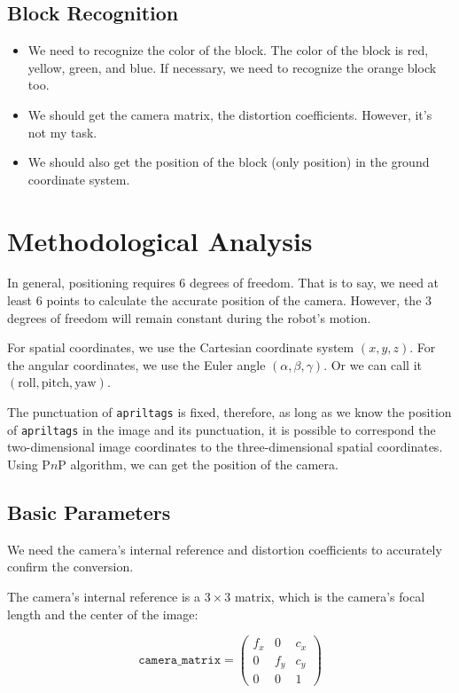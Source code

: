 \documentclass{article}
\begin{document}
\subsection{Block Recognition}

\begin{itemize}
  \item We need to recognize the color of the block. The color of the block is red, yellow, green, and blue. If necessary, we need to recognize the orange block too.
  \item We should get the camera matrix, the distortion coefficients. However, it's not my task.
  \item We should also get the position of the block (only position) in the ground coordinate system.
\end{itemize}

\section{Methodological Analysis}
In general, positioning requires $6$ degrees of freedom. That is to say, we need at least $6$ points to calculate the accurate position of the camera. However, the $3$ degrees of freedom will remain constant during the robot's motion.

For spatial coordinates, we use the Cartesian coordinate system $\left(x,y,z\right)$. For the angular coordinates, we use the Euler angle $\left(\alpha,\beta,\gamma\right)$. Or we can call it $\left(\mathrm{roll},\mathrm{pitch},\mathrm{yaw}\right)$.

The punctuation of \texttt{apriltags} is fixed, therefore, as long as we know the position of \texttt{apriltags} in the image and its punctuation, it is possible to correspond the two-dimensional image coordinates to the three-dimensional spatial coordinates. Using P$n$P algorithm, we can get the position of the camera.

\subsection{Basic Parameters}
We need the camera's internal reference and distortion coefficients to accurately confirm the conversion.

The camera's internal reference is a $3\times3$ matrix, which is the camera's focal length and the center of the image:

\[
  \texttt{camera\_matrix}=\left(\begin{matrix}
    f_x & 0 & c_x \\
    0 & f_y & c_y \\
    0 & 0 & 1
  \end{matrix}\right)
\]
\end{document}
